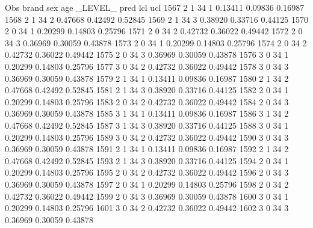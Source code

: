 \documentclass{article}
\begin{document}
\begin{Woutput}
 Obs    brand    sex    age    _LEVEL_      pred       lcl        ucl
1567      2       1      34       1       0.13411    0.09836    0.16987
1568      2       1      34       2       0.47668    0.42492    0.52845
1569      2       1      34       3       0.38920    0.33716    0.44125
1570      2       0      34       1       0.20299    0.14803    0.25796
1571      2       0      34       2       0.42732    0.36022    0.49442
1572      2       0      34       3       0.36969    0.30059    0.43878
1573      2       0      34       1       0.20299    0.14803    0.25796
1574      2       0      34       2       0.42732    0.36022    0.49442
1575      2       0      34       3       0.36969    0.30059    0.43878
1576      3       0      34       1       0.20299    0.14803    0.25796
1577      3       0      34       2       0.42732    0.36022    0.49442
1578      3       0      34       3       0.36969    0.30059    0.43878
1579      2       1      34       1       0.13411    0.09836    0.16987
1580      2       1      34       2       0.47668    0.42492    0.52845
1581      2       1      34       3       0.38920    0.33716    0.44125
1582      2       0      34       1       0.20299    0.14803    0.25796
1583      2       0      34       2       0.42732    0.36022    0.49442
1584      2       0      34       3       0.36969    0.30059    0.43878
1585      3       1      34       1       0.13411    0.09836    0.16987
1586      3       1      34       2       0.47668    0.42492    0.52845
1587      3       1      34       3       0.38920    0.33716    0.44125
1588      3       0      34       1       0.20299    0.14803    0.25796
1589      3       0      34       2       0.42732    0.36022    0.49442
1590      3       0      34       3       0.36969    0.30059    0.43878
1591      2       1      34       1       0.13411    0.09836    0.16987
1592      2       1      34       2       0.47668    0.42492    0.52845
1593      2       1      34       3       0.38920    0.33716    0.44125
1594      2       0      34       1       0.20299    0.14803    0.25796
1595      2       0      34       2       0.42732    0.36022    0.49442
1596      2       0      34       3       0.36969    0.30059    0.43878
1597      2       0      34       1       0.20299    0.14803    0.25796
1598      2       0      34       2       0.42732    0.36022    0.49442
1599      2       0      34       3       0.36969    0.30059    0.43878
1600      3       0      34       1       0.20299    0.14803    0.25796
1601      3       0      34       2       0.42732    0.36022    0.49442
1602      3       0      34       3       0.36969    0.30059    0.43878

\end{Woutput}
\end{document}
